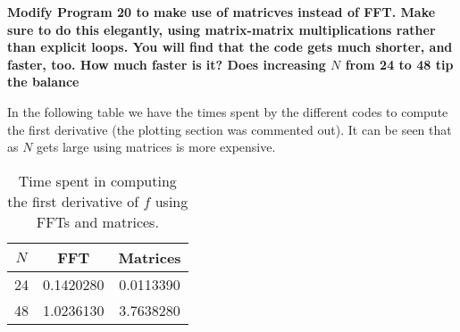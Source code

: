 \textbf{Modify Program 20 to make use of matricves instead of FFT. Make sure to do this elegantly, using matrix-matrix multiplications rather than explicit loops. You will find that the code gets much shorter, and faster, too. How much faster is it? Does increasing $N$ from 24 to 48 tip the balance}
\newline

In the following table we have the times spent by the different codes to compute the first derivative (the plotting section was commented out). It can be seen that as $N$ gets large using matrices is more expensive.

\begin{table}[h]
\centering
 \begin{tabular}{||c c c||} 
 \hline
 $N$ & FFT & Matrices \\ [0.5ex] 
 \hline\hline
 24 & 0.1420280 & 0.0113390 \\ 
 \hline
 48 & 1.0236130 & 3.7638280 \\ [1ex] 
 \hline
\end{tabular}
\caption{Time spent in computing the first derivative of $f$ using FFTs and matrices.}
\end{table}

